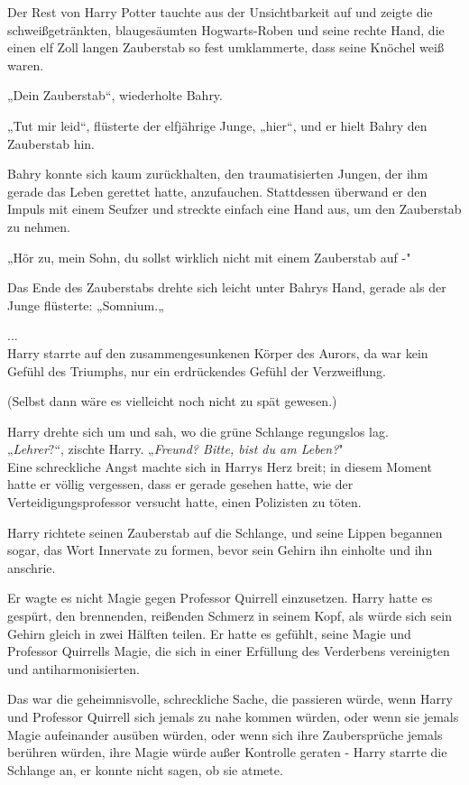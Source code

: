 {Der Rest von Harry Potter tauchte aus der Unsichtbarkeit auf und zeigte die schweißgetränkten, blaugesäumten Hogwarts-Roben und seine rechte Hand, die einen elf Zoll langen Zauberstab so fest umklammerte, dass seine Knöchel weiß waren.

„Dein Zauberstab“, wiederholte Bahry.

„Tut mir leid“, flüsterte der elfjährige Junge, „hier“, und er hielt Bahry den Zauberstab hin.

Bahry konnte sich kaum zurückhalten, den traumatisierten Jungen, der ihm gerade das Leben gerettet hatte, anzufauchen. Stattdessen überwand er den Impuls mit einem Seufzer und streckte einfach eine Hand aus, um den Zauberstab zu nehmen.

„Hör zu, mein Sohn, du sollst wirklich nicht mit einem Zauberstab auf -"

Das Ende des Zauberstabs drehte sich leicht unter Bahrys Hand, gerade als der Junge flüsterte: „Somnium.„

...\\ Harry starrte auf den zusammengesunkenen Körper des Aurors, da war kein Gefühl des Triumphs, nur ein erdrückendes Gefühl der Verzweiflung.

(Selbst dann wäre es vielleicht noch nicht zu spät gewesen.)

Harry drehte sich um und sah, wo die grüne Schlange regungslos lag.\\ „\emph{Lehrer}?“, zischte Harry. „\emph{Freund? Bitte, bist du am Leben?}"\\ Eine schreckliche Angst machte sich in Harrys Herz breit; in diesem Moment hatte er völlig vergessen, dass er gerade gesehen hatte, wie der Verteidigungsprofessor versucht hatte, einen Polizisten zu töten.

Harry richtete seinen Zauberstab auf die Schlange, und seine Lippen begannen sogar, das Wort Innervate zu formen, bevor sein Gehirn ihn einholte und ihn anschrie.

Er wagte es nicht Magie gegen Professor Quirrell einzusetzen. Harry hatte es gespürt, den brennenden, reißenden Schmerz in seinem Kopf, als würde sich sein Gehirn gleich in zwei Hälften teilen. Er hatte es gefühlt, seine Magie und Professor Quirrells Magie, die sich in einer Erfüllung des Verderbens vereinigten und antiharmonisierten.

Das war die geheimnisvolle, schreckliche Sache, die passieren würde, wenn Harry und Professor Quirrell sich jemals zu nahe kommen würden, oder wenn sie jemals Magie aufeinander ausüben würden, oder wenn sich ihre Zaubersprüche jemals berühren würden, ihre Magie würde außer Kontrolle geraten - Harry starrte die Schlange an, er konnte nicht sagen, ob sie atmete.

}
